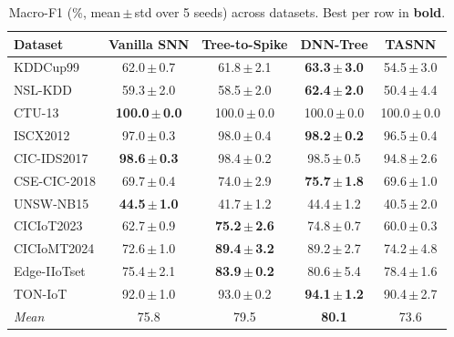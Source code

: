 \begin{table}[t]
\centering
\caption{Macro-F1 (\%, mean\,$\pm$\,std over 5 seeds) across datasets. Best per row in \textbf{bold}.}
\label{tab:f1_macro}
\footnotesize
\setlength{\tabcolsep}{4pt}
\begin{tabular}{lcccc}
\toprule
Dataset & Vanilla SNN & Tree-to-Spike & DNN-Tree & TASNN \\
\midrule
KDDCup99 & 62.0\,$\pm$\,0.7 & 61.8\,$\pm$\,2.1 & \textbf{63.3\,$\pm$\,3.0} & 54.5\,$\pm$\,3.0 \\
NSL-KDD & 59.3\,$\pm$\,2.0 & 58.5\,$\pm$\,2.0 & \textbf{62.4\,$\pm$\,2.0} & 50.4\,$\pm$\,4.4 \\
CTU-13 & \textbf{100.0\,$\pm$\,0.0} & 100.0\,$\pm$\,0.0 & 100.0\,$\pm$\,0.0 & 100.0\,$\pm$\,0.0 \\
ISCX2012 & 97.0\,$\pm$\,0.3 & 98.0\,$\pm$\,0.4 & \textbf{98.2\,$\pm$\,0.2} & 96.5\,$\pm$\,0.4 \\
CIC-IDS2017 & \textbf{98.6\,$\pm$\,0.3} & 98.4\,$\pm$\,0.2 & 98.5\,$\pm$\,0.5 & 94.8\,$\pm$\,2.6 \\
CSE-CIC-2018 & 69.7\,$\pm$\,0.4 & 74.0\,$\pm$\,2.9 & \textbf{75.7\,$\pm$\,1.8} & 69.6\,$\pm$\,1.0 \\
UNSW-NB15 & \textbf{44.5\,$\pm$\,1.0} & 41.7\,$\pm$\,1.2 & 44.4\,$\pm$\,1.2 & 40.5\,$\pm$\,2.0 \\
CICIoT2023 & 62.7\,$\pm$\,0.9 & \textbf{75.2\,$\pm$\,2.6} & 74.8\,$\pm$\,0.7 & 60.0\,$\pm$\,0.3 \\
CICIoMT2024 & 72.6\,$\pm$\,1.0 & \textbf{89.4\,$\pm$\,3.2} & 89.2\,$\pm$\,2.7 & 74.2\,$\pm$\,4.8 \\
Edge-IIoTset & 75.4\,$\pm$\,2.1 & \textbf{83.9\,$\pm$\,0.2} & 80.6\,$\pm$\,5.4 & 78.4\,$\pm$\,1.6 \\
TON-IoT & 92.0\,$\pm$\,1.0 & 93.0\,$\pm$\,0.2 & \textbf{94.1\,$\pm$\,1.2} & 90.4\,$\pm$\,2.7 \\
\midrule
\textit{Mean} & 75.8 & 79.5 & \textbf{80.1} & 73.6 \\
\bottomrule
\end{tabular}
\end{table}
